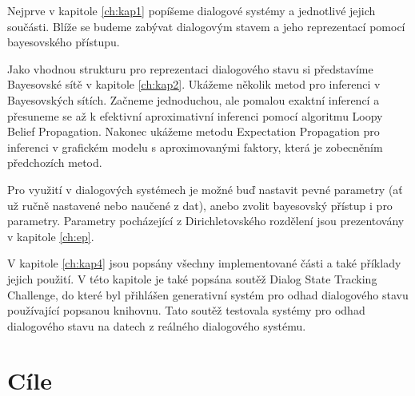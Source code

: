 Nejprve v kapitole \ref{ch:kap1} popíšeme dialogové systémy a jednotlivé jejich součásti.
Blíže se budeme zabývat dialogovým stavem a jeho reprezentací pomocí bayesovského přístupu.

Jako vhodnou strukturu pro reprezentaci dialogového stavu si představíme Bayesovské sítě v kapitole \ref{ch:kap2}.
Ukážeme několik metod pro inferenci v Bayesovských sítích.
Začneme jednoduchou, ale pomalou exaktní inferencí a přesuneme se až k efektivní aproximativní inferenci pomocí algoritmu Loopy Belief Propagation.
Nakonec ukážeme metodu Expectation Propagation pro inferenci v grafickém modelu s aproximovanými faktory, která je zobecněním předchozích metod.

Pro využití v dialogových systémech je možné buď nastavit pevné parametry (ať už ručně nastavené nebo naučené z dat), anebo zvolit bayesovský přístup i pro parametry.
Parametry pocházející z Dirichletovského rozdělení jsou prezentovány v kapitole \ref{ch:ep}.

V kapitole \ref{ch:kap4} jsou popsány všechny implementované části a také příklady jejich použití.
V této kapitole je také popsána soutěž Dialog State Tracking Challenge, do které byl přihlášen generativní systém pro odhad dialogového stavu používající popsanou knihovnu.
Tato soutěž testovala systémy pro odhad dialogového stavu na datech z reálného dialogového systému.

\section*{Cíle}

